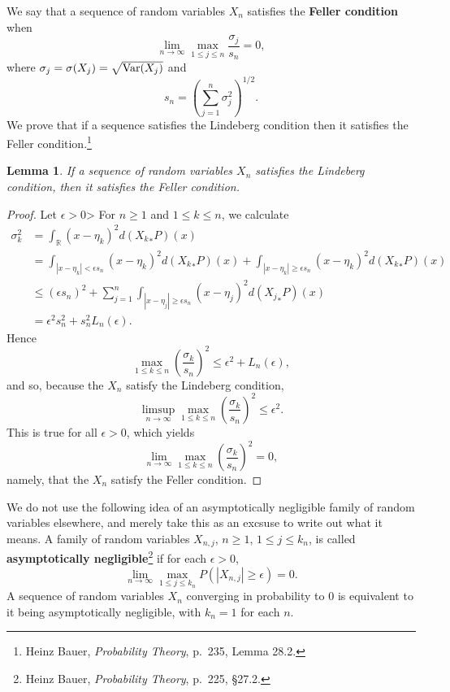 \documentclass{article}
\newcommand{\Var}{\ensuremath\mathrm{Var}}
\newtheorem{lemma}[theorem]{Lemma}
\theoremstyle{definition}
\begin{document}
We say that a sequence of random variables $X_n$ satisfies the
\textbf{Feller condition} when
\[
\lim_{n \to \infty} \max_{1 \leq j \leq n} \frac{\sigma_j}{s_n}=0,
\]
where $\sigma_j=\sigma(X_j)=\sqrt{\Var(X_j)}$ and 
\[
s_n = \left(\sum_{j=1}^n \sigma_j^2 \right)^{1/2}.
\]
We prove that if a sequence satisfies the Lindeberg condition then it satisfies the Feller condition.\footnote{Heinz
Bauer, {\em Probability Theory}, p.~235, Lemma 28.2.}

\begin{lemma}
If a sequence of random variables $X_n$ satisfies the Lindeberg condition, then it satisfies the Feller condition.
\label{feller}
\end{lemma}
\begin{proof}
Let $\epsilon>0$>
For $n \geq 1$ and $1 \leq k \leq n$, we calculate
\begin{align*}
\sigma_k^2&=\int_\mathbb{R} (x-\eta_k)^2 d({X_k}_*P)(x)\\
&= \int_{|x-\eta_k|<\epsilon s_n} (x-\eta_k)^2 d({X_k}_*P)(x)
+\int_{|x-\eta_k|\geq \epsilon s_n} (x-\eta_k)^2 d({X_k}_*P)(x)\\
&\leq (\epsilon s_n)^2 +\sum_{j=1}^n \int_{|x-\eta_j|\geq \epsilon s_n} (x-\eta_j)^2 d({X_j}_*P)(x)\\
&= \epsilon^2 s_n^2 + s_n^2 L_n(\epsilon).
\end{align*}
Hence
\[
\max_{1 \leq k \leq n} \left( \frac{\sigma_k}{s_n} \right)^2 \leq \epsilon^2 + L_n(\epsilon),
\]
and so, because the $X_n$ satisfy the Lindeberg condition, 
\[
\limsup_{n \to \infty} \max_{1 \leq k \leq n}  \left( \frac{\sigma_k}{s_n} \right)^2
\leq \epsilon^2.
\]
This is true for all $\epsilon>0$, which yields
\[
\lim_{n \to \infty} \max_{1 \leq k \leq n}  \left( \frac{\sigma_k}{s_n} \right)^2 = 0,
\]
namely, that the $X_n$ satisfy the Feller condition.
\end{proof}



We do not use the following idea of an asymptotically negligible 
family of random variables elsewhere, and merely take this as an excsuse to write out what it means.
A family of random variables $X_{n,j}$, $n \geq 1$, $1 \leq j \leq k_n$, is called
\textbf{asymptotically negligible}\footnote{Heinz Bauer,
{\em Probability Theory}, p.~225, \S 27.2.}
if for each $\epsilon>0$,
\[
\lim_{n \to \infty} \max_{1 \leq j \leq k_n} P(|X_{n,j}| \geq \epsilon) =0.
\]
A sequence of random variables $X_n$ converging in probability to $0$ is equivalent to
it being asymptotically negligible, with $k_n=1$ for each $n$. 
\end{document}
